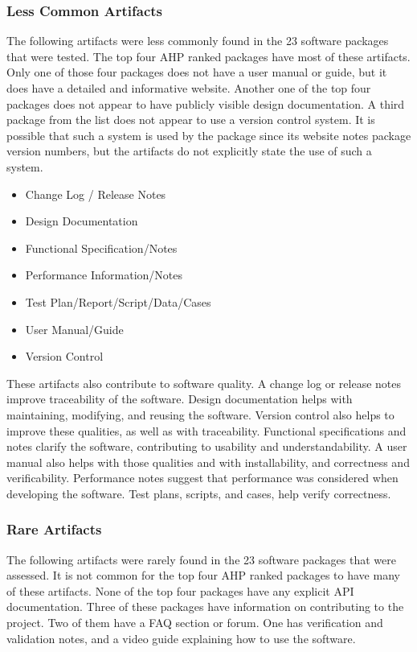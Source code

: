 \documentclass[12pt, notitlepage]{article}
\begin{document}
\subsubsection{Less Common Artifacts}
The following artifacts were less commonly found in the 23 software packages that were tested. The top four AHP ranked packages have most of these artifacts.
Only one of those four packages does not have a user manual or guide, but it does have a detailed and informative website. Another one of the top four packages does not appear to have publicly visible design documentation. A third package from the list does not appear to use a version control system. It is possible that such a system is used by the package since its website notes package version numbers, but the artifacts do not explicitly state the use of such a system.

\begin{singlespace}
	\begin{multicols}{2}	
		\begin{itemize}
			\item Change Log / Release Notes
			\item Design Documentation
			\item Functional Specification/Notes	
			\item Performance Information/Notes
			\item Test Plan/Report/Script/Data/Cases
			\item User Manual/Guide
			\item Version Control
		\end{itemize}
	\end{multicols}
\end{singlespace}

These artifacts also contribute to software quality. A change log or release notes improve traceability of the software. Design documentation helps with maintaining, modifying, and reusing the software. Version control also helps to improve these qualities, as well as with traceability. Functional specifications and notes clarify the software, contributing to usability and understandability. A user manual also helps with those qualities and with installability, and correctness and verificability. Performance notes suggest that performance was considered when developing the software. Test plans, scripts, and cases, help verify correctness. 


\subsubsection{Rare Artifacts}
The following artifacts were rarely found in the 23 software packages that were assessed. It is not common for the top four AHP ranked packages to have many of these artifacts. None of the top four packages have any explicit API documentation. Three of these packages have information on contributing to the project. Two of them have a FAQ section or forum. One has verification and validation notes, and a video guide explaining how to use the software. 
\end{document}
